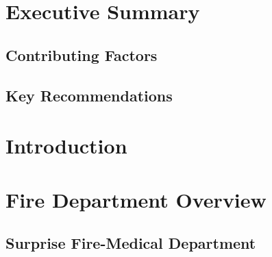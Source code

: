 \documentclass[12pt,oneside]{book}
\begin{document}
\mainmatter

%


\newpage
\chapter{Executive Summary}
\label{chap:executive_summary}
\setcounter{page}{1}


\section{Contributing Factors}


\section{Key Recommendations}


\chapter{Introduction}
\label{chap:intro}


\chapter{Fire Department Overview}
\label{chap:fd_overview}


\section{Surprise Fire-Medical Department}
\end{document}
